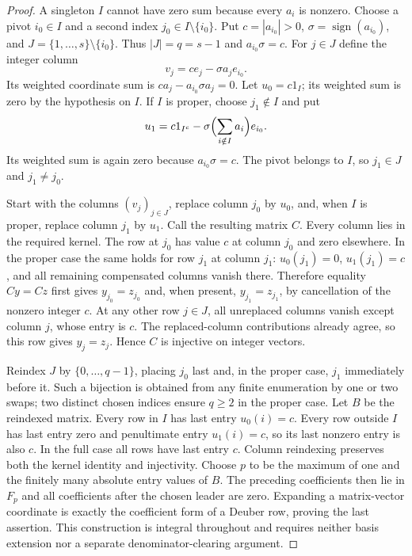 \begin{proof}
A singleton $I$ cannot have zero sum because every $a_i$ is nonzero.
Choose a pivot $i_0\in I$ and a second index $j_0\in I\setminus\{i_0\}$.
Put $c=|a_{i_0}|>0$, $\sigma=\operatorname{sign}(a_{i_0})$, and
$J=\{1,\ldots,s\}\setminus\{i_0\}$.  Thus $|J|=q=s-1$ and
$a_{i_0}\sigma=c$.  For $j\in J$ define the integer column
\[
 v_j=c e_j-\sigma a_j e_{i_0}.
\]
Its weighted coordinate sum is $c a_j-a_{i_0}\sigma a_j=0$.
Let $u_0=c1_I$; its weighted sum is zero by the hypothesis on $I$.
If $I$ is proper, choose $j_1\notin I$ and put
\[
 u_1=c1_{I^c}-\sigma\Bigl(\sum_{i\notin I}a_i\Bigr)e_{i_0}.
\]
Its weighted sum is again zero because $a_{i_0}\sigma=c$.
The pivot belongs to $I$, so $j_1\in J$ and $j_1\ne j_0$.

Start with the columns $(v_j)_{j\in J}$, replace column $j_0$ by $u_0$,
and, when $I$ is proper, replace column $j_1$ by $u_1$.
Call the resulting matrix $C$.  Every column lies in the required kernel.
The row at $j_0$ has value $c$ at column $j_0$ and zero elsewhere.
In the proper case the same holds for row $j_1$ at column $j_1$:
$u_0(j_1)=0$, $u_1(j_1)=c$, and all remaining compensated columns
vanish there.  Therefore equality $Cy=Cz$ first gives
$y_{j_0}=z_{j_0}$ and, when present, $y_{j_1}=z_{j_1}$, by cancellation
of the nonzero integer $c$.  At any other row $j\in J$, all unreplaced
columns vanish except column $j$, whose entry is $c$.  The replaced-column
contributions already agree, so this row gives $y_j=z_j$.
Hence $C$ is injective on integer vectors.

Reindex $J$ by $\{0,\ldots,q-1\}$, placing $j_0$ last and, in the
proper case, $j_1$ immediately before it.  Such a bijection is obtained
from any finite enumeration by one or two swaps; two distinct chosen
indices ensure $q\geq2$ in the proper case.  Let $B$ be the reindexed
matrix.  Every row in $I$ has last entry $u_0(i)=c$.  Every row outside
$I$ has last entry zero and penultimate entry $u_1(i)=c$, so its last
nonzero entry is also $c$.  In the full case all rows have last entry $c$.
Column reindexing preserves both the kernel identity and injectivity.
Choose $p$ to be the maximum of one and the finitely many absolute entry
values of $B$.  The preceding coefficients then lie in $F_p$ and all
coefficients after the chosen leader are zero.  Expanding a matrix-vector
coordinate is exactly the coefficient form of a Deuber row, proving the
last assertion.  This construction is integral throughout and requires
neither basis extension nor a separate denominator-clearing argument.
\end{proof}


